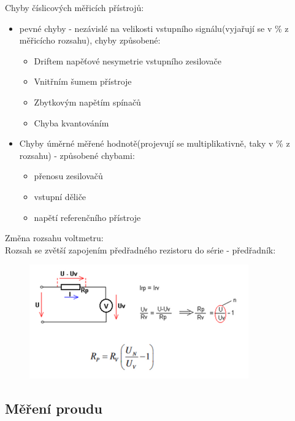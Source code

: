 Chyby číslicových měřicích přístrojů:
\begin{itemize}
    \item pevné chyby - nezávislé na velikosti vstupního signálu(vyjařují se v \% z měřicícho rozsahu), chyby způsobené:
          \begin{itemize}
              \item Driftem napěťové nesymetrie vstupního zesilovače
              \item Vnitřním šumem přístroje
              \item Zbytkovým napětím spínačů
              \item Chyba kvantováním
          \end{itemize}
    \item Chyby úměrné měřené hodnotě(projevují se multiplikativně, taky v \% z rozsahu) - způsobené chybami:
          \begin{itemize}
              \item přenosu zesilovačů
              \item vstupní děliče
              \item napětí referenčního přístroje
          \end{itemize}
\end{itemize}
Změna rozsahu voltmetru:\\
Rozsah se zvětší zapojením předřadného rezistoru do série - předřadník:\\
\begin{figure}[H]
    \includegraphics*[scale = 1.5]{images/predradnik.png}
\end{figure}

\subsection*{Měření proudu}

